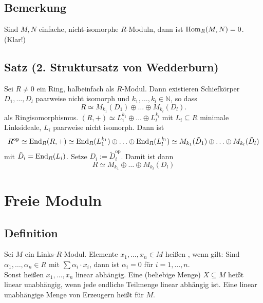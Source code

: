 \subsection[Bemerkung: Einfache, nicht-isomorphe $R$-Moduln]{Bemerkung} %
\label{sub:230}
Sind $M,N$ einfache, nicht-isomorphe $R$-Moduln, dann ist $\operatorname{Hom}_R(M,N) = 0$. (Klar!)

\subsection{Satz (2. Struktursatz von Wedderburn)} %
\label{sub:231}
Sei $R \not= 0$ ein Ring, halbeinfach als $R$-Modul. Dann existieren Schiefkörper $D_1, \ldots , D_l$ paarweise nicht isomorph und $k_1, \ldots , k_l \in \mathds{N}$, so
dass 
\[
	R \simeq M_{k_1}(D_1) \oplus \ldots \oplus M_{k_l}(D_l).
\]
als Ringisomorphismus.
$(R,+) \simeq L_1^{k_1} \oplus \ldots \oplus L_l^{k_l}$ mit $L_i \subseteq R$ minimale Linksideale, $L_i$ paarweise nicht isomorph. Dann ist 
\[
	R^\mathrm{op} \simeq \operatorname{End}_R(R,+) \simeq \operatorname{End}_R(L_1^{k_1}) \oplus \ldots \oplus \operatorname{End}_R(L_l^{k_l})  \simeq M_{k_1}(\tilde D_1) \oplus \ldots \oplus M_{k_l}(\tilde D_l)
\]
mit $\tilde D_i = \operatorname{End}_R(L_i)$. Setze $D_i := \tilde D_i^\mathrm{op}$. Damit ist dann 
\[
	R \simeq M_{k_1} \oplus \ldots \oplus M_{k_l}(D_l)
\]
\section*{Freie Moduln}

\subsection[Definition: linear unabhängig und Basen]{Definition} %
\label{sub:232}
Sei $M$ ein Links-$R$-Modul. Elemente $x_1, \ldots , x_n \in M$ heißen , wenn gilt: Sind $\alpha_1, \ldots , \alpha_n \in R$ mit 
$\sum \alpha_i \cdot x_i$, dann ist $\alpha_i = 0$ für $i=1, \ldots ,n$. \\
Sonst heißen $x_1, \ldots , x_n$ linear abhängig. Eine (beliebige Menge) $X \subseteq M$ heißt linear unabhängig, wenn jede endliche Teilmenge linear abhängig ist. Eine 
linear unabhängige Menge von Erzeugern heißt  für $M$. 

